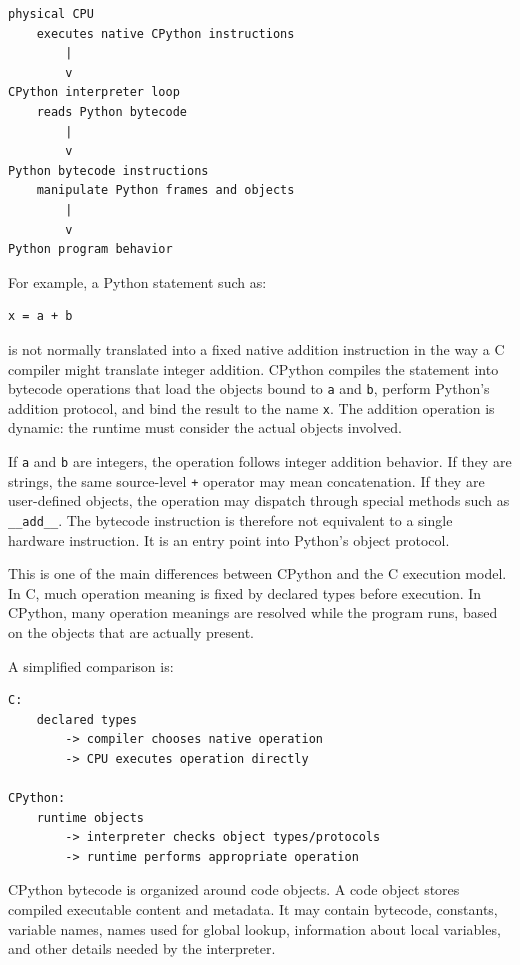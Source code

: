 \begin{verbatim}
physical CPU
    executes native CPython instructions
        |
        v
CPython interpreter loop
    reads Python bytecode
        |
        v
Python bytecode instructions
    manipulate Python frames and objects
        |
        v
Python program behavior
\end{verbatim}

For example, a Python statement such as:

\begin{verbatim}
x = a + b
\end{verbatim}

is not normally translated into a fixed native addition instruction in the way a C compiler might translate integer addition. CPython compiles the statement into bytecode operations that load the objects bound to \texttt{a} and \texttt{b}, perform Python's addition protocol, and bind the result to the name \texttt{x}. The addition operation is dynamic: the runtime must consider the actual objects involved.

If \texttt{a} and \texttt{b} are integers, the operation follows integer addition behavior. If they are strings, the same source-level \texttt{+} operator may mean concatenation. If they are user-defined objects, the operation may dispatch through special methods such as \texttt{\_\_add\_\_}. The bytecode instruction is therefore not equivalent to a single hardware instruction. It is an entry point into Python's object protocol.

This is one of the main differences between CPython and the C execution model. In C, much operation meaning is fixed by declared types before execution. In CPython, many operation meanings are resolved while the program runs, based on the objects that are actually present.

A simplified comparison is:

\begin{verbatim}
C:
    declared types
        -> compiler chooses native operation
        -> CPU executes operation directly

CPython:
    runtime objects
        -> interpreter checks object types/protocols
        -> runtime performs appropriate operation
\end{verbatim}

CPython bytecode is organized around code objects. A code object stores compiled executable content and metadata. It may contain bytecode, constants, variable names, names used for global lookup, information about local variables, and other details needed by the interpreter.

